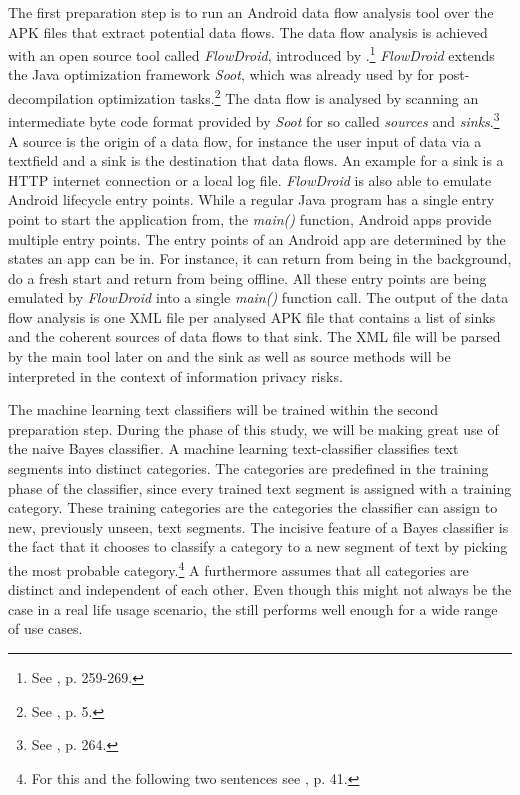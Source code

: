 The first preparation step is to run an Android data flow analysis tool over the APK files that extract potential data flows.
The data flow analysis is achieved with an open source tool called \textit{FlowDroid}, introduced by \cite{Arzt2014}.\footnote{See \cite{Arzt2014}, p. 259-269.}
\textit{FlowDroid} extends the Java optimization framework \textit{Soot}, which was already used by \cite{Enck2011} for post-decompilation optimization tasks.\footnote{See \cite{Enck2011}, p. 5.}
The data flow is analysed by scanning an intermediate byte code format provided by \textit{Soot} for so called \textit{sources} and \textit{sinks}.\footnote{See \cite{Arzt2014}, p. 264.}
A source is the origin of a data flow, for instance the user input of data via a textfield and a sink is the destination that data flows.
An example for a sink is a HTTP internet connection or a local log file.
\textit{FlowDroid} is also able to emulate Android lifecycle entry points.
While a regular Java program has a single entry point to start the application from, the \textit{main()} function, Android apps provide multiple entry points.
The entry points of an Android app are determined by the states an app can be in. 
For instance, it can return from being in the background, do a fresh start and return from being offline.
All these entry points are being emulated by \textit{FlowDroid} into a single \textit{main()} function call.
The output of the data flow analysis is one XML file per analysed APK file that contains a list of sinks and the coherent sources of data flows to that sink.
The XML file will be parsed by the main \sca tool later on and the sink as well as source methods will be interpreted in the context of information privacy risks.

The machine learning text classifiers will be trained within the second preparation step.
During the \sca phase of this study, we will be making great use of the naive Bayes classifier.
A machine learning text-classifier classifies text segments into distinct categories. 
The categories are predefined in the training phase of the classifier, since every trained text segment is assigned with a training category.
These training categories are the categories the classifier can assign to new, previously unseen, text segments.
The incisive feature of a Bayes classifier is the fact that it chooses to classify a category to a new segment of text by picking the most probable category.\footnote{For this and the following two sentences see \cite{Rish2001}, p. 41.}
A \nbc furthermore assumes that all categories are distinct and independent of each other. 
Even though this might not always be the case in a real life usage scenario, the \nbc still performs well enough for a wide range of use cases.

